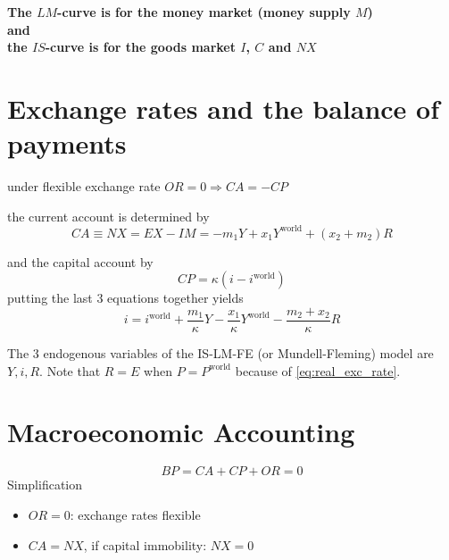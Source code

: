 \documentclass[a4paper] {scrartcl}
\begin{document}
\textbf{The $LM$-curve is for the money market (money supply $M$)\\and\\the $IS$-curve is for the goods market $I$, $C$ and $NX$}





\section{Exchange rates and the balance of payments} %
\label{sec:exchange_rates_and_the_balance_of_payments}
under flexible exchange rate $OR=0 \Rightarrow CA=-CP$

the current account is determined by
\begin{equation}
	CA \equiv NX = EX -IM =-m_1Y+ x_1Y^{\text{world}}+(x_2+m_2)R
\end{equation}

and the capital account by
\begin{equation}
	CP = \kappa(i-i^{\text{world}})
\end{equation}
putting the last 3 equations together yields
\begin{equation}
	 i=i^{\text{world}}+\frac{m_1}{\kappa}Y-\frac{x_1}{\kappa}Y^{\text{world}}-\frac{m_2+x_2}{\kappa}R
\end{equation}

The 3 endogenous variables of the IS-LM-FE (or Mundell-Fleming) model are $Y, i, R$. Note that $R=E$ when $P=P^{\text{world}}$ because of \ref{eq:real_exc_rate}.


\section{Macroeconomic Accounting}

\begin{equation}
	BP = CA + CP + OR = 0
\end{equation}
Simplification
\begin{itemize}
	\item $OR=0$: exchange rates flexible
	\item $CA=NX$, if capital immobility: $NX=0$
\end{itemize}
\end{document}
